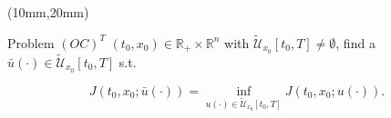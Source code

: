 \begin{frame}
	\begin{textblock*}{110mm}(10mm,20mm)
		\begin{graybox}{Problem $(OC)^T$}
			$(t_0,x_0)\in \mathbb{R}_{+}\times \mathbb{R}^n$ with $\tilde{\mathcal{U}}_{x_0}[t_0,T]\neq\emptyset$, find a $\bar{u}(\cdot)\in \tilde{\mathcal{U}}_{x_0}[t_0,T]$ s.t.
			
			\begin{equation*}
				J(t_0,x_0;\bar{u}(\cdot))=\inf_{u(\cdot)\in \tilde{\mathcal{U}}_{x_0}[t_0,T]} J(t_0,x_0;u(\cdot)).
			\end{equation*}
		\end{graybox}
	\end{textblock*}
\end{frame}
